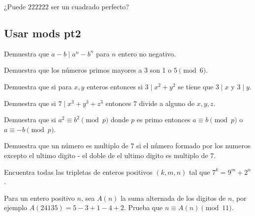 \documentclass[11pt]{scrartcl}
\newcommand{\thmdifficulty}{0}
\newcommand{\problemdiff}[1]{\renewcommand{\thmdifficulty}{#1}}
\begin{document}
\problemdiff{1}
\begin{problema}
¿Puede $222222$ ser un cuadrado perfecto?
\end{problema}

\newpage
\subsection{Usar mods pt2}

\problemdiff{1}
\begin{problema}
Demuestra que $a-b \mid a^n-b^n$ para $n$ entero no negativo. 
\end{problema}

\problemdiff{1}
\begin{problema}
Demuestra que los n\'umeros primos mayores a 3 son 1 o $5 \pmod 6$. 
\end{problema}

\problemdiff{1}
\begin{problema}
Demuestra que si para $x,y$ enteros entonces si $3\mid x^2+y^2$ se tiene que $3\mid x$ y $3\mid y$. 
\end{problema}

\problemdiff{1}
\begin{problema}
Demuestra que si $7 \mid x^3+y^3+z^3$ entonces $7 $ divide a alguno de $x,y,z$.
\end{problema}

\problemdiff{1}
\begin{problema}
Demuestra que si $a^2 \equiv b^2 \pmod p$ donde $p$ es primo entonces $a\equiv b \pmod p$ o $a\equiv -b \pmod p$.
\end{problema}

\problemdiff{1}
\begin{problema}
Demuestra que un número es multiplo de 7 si el número formado por los numeros excepto el ultimo digito - el doble de el ultimo digito es multiplo de 7.
\end{problema}

\problemdiff{1}
\begin{problema}
Encuentra todas las tripletas de enteros positivos $(k,m,n)$ tal que $7^k=9^m+2^n$.
\end{problema}

\problemdiff{1}
\begin{problema}
Para un entero positivo $n$, sea $A(n)$ la suma alternada de los digitos de $n$, por ejemplo $A(24135)= 5 -3 +1 -4 +2$. Prueba que $n \equiv A(n) \pmod{11}$.
\end{problema}
\end{document}
